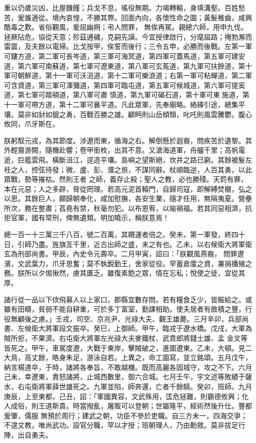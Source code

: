 \begin{pinyinscope}
 重以仍歲災凶，比屋饑饉；兵戈不息，徭役無期。力竭轉輸，身填溝壑。百姓愁苦，爰誰適從。境內哀惶，不勝其弊。回面內向，各懷性命之圖；黃髮稚齒，咸興酷毒之歎。省俗觀風，爰屈幽朔；弔人問罪，
 無俟再駕。親總六師，用申九伐。拯厥阽危，協從天意；殄茲逋穢，克嗣先謨。今宜授律啟行，分麾屆路；掩勃澥而雷震，及夫餘以電掃。比戈按甲，俟誓而後行；三令五申，必勝而後戰。左第一軍可鏤方道，第二軍可長岑道，第三軍可海冥道，第四軍可蓋馬道，第五軍可建安道，第六軍可南蘇道，第七軍可遼東道，第八軍可玄菟道，第九軍可扶餘道，第十軍可朝鮮道，第十一軍可沃沮道，第十二軍可樂浪道；右第一軍可粘蟬道，第二軍可含資道，第三軍可渾彌道，第四軍可臨屯道，第五軍可候城道，第六軍可提奚道，第七軍可踏頓道，第八軍可肅
 慎道，第九軍可碣石道，第十軍可東施道，第十一軍可帶方道，第十二軍可襄平道。凡此眾軍，先奉廟略。絡繹引途，總集平壤。莫非如豺如貔之勇，百戰百勝之雄。顧眄則山岳傾頹，叱吒則風雲騰鬱。腹心攸同，爪牙斯在。



 朕躬馭元戎，為其節度。涉遼而東，循海之右。解倒懸於遐裔，問疾苦於遺黎。其外輕齎游闕，隨機赴響；卷甲銜枚，出其不意。又滄海道軍，舟艫千里；高帆電逝，巨艦雲飛。橫斷沮江，逕造平壤。島嶼之望斯絕，坎井之路已窮。其餘被髮左衽之人，控弦待發；微、盧、彭、濮之旅，不謀同辭。杖順臨逆，人百其勇，以此眾戰，勢等摧枯。然則王者
 之師，義存止殺；聖人之教，必也勝殘。天罰有罪，本在元惡；人之多辟，脅從罔理。若高元泥首轅門，自歸司寇，即解縛焚櫬，弘之以恩。其餘巨人，願歸朝奉化，咸加慰撫，各安生業，隨才任用，無隔夷夏。營壘所次，務在整肅；萏堯有禁，秋毫勿犯。以布恩宥，以喻禍福。若其同惡相濟，抗拒官軍，國有常刑，俾無遺類。明加曉示，稱朕意焉！



 總一百一十三萬三千八百，號二百萬，其饋運者倍之。癸未，第一軍發，終四十日，引師乃盡。旌旗亙千里，近古出師之盛，未之有也。乙未，以右候衛大將軍衛玄為刑部尚書。甲辰，內史令元壽卒。二月甲寅，詔曰：「朕觀風燕裔，
 問罪遼濱，文武葉力，爪牙思奮；莫不執銳勤王，舍家從役。罕蓄倉廩之資，兼捐播殖之務。朕所以夕惕愀然，慮其匱乏。雖復素飽之眾，情在忘私；悅使之徒，宜從其厚。



 諸行從一品以下佽飛募人以上家口，郡縣宜數存問。若有糧食乏少，皆賑給之。或雖有田疇，貧弱不能自耕重，可於多丁富室，勤課相助。使夫居者有斂積之豐，行役無顧後之慮。」壬戎，司空、京兆尹、光祿大夫、觀王雄薨。三月辛卯，兵部尚書、左候衛大將軍段文振卒。癸巳，上御師。甲午，臨戎于遼水橋。戊戌，大軍為賊所拒，不果濟。右屯衛大將軍左光祿大夫麥鐵杖、武賁郎將錢士雄、孟
 金叉等皆死之。甲午，車駕度遼，大戰于東岸，擊賊破之，進圍遼東。乙未，大頓。見二大鳥，高丈餘，皓身朱足，游泳自若。上異之，命工圖寫，並立銘頌。五月戊午，納言楊達卒，于時，諸將各奉旨，不敢越機。既而高麗各固城守，攻之不下。六月己未，幸遼東，責怒諸將，止城西數里，御六合城。七月壬午，宇文述等敗績于薩水，右屯衛將軍薛世雄死之。九軍並陷，師奔還，亡者千餘騎。癸卯，班師。九月庚辰，上至東都，己丑，詔：「軍國異容，文武殊用，匡危拯難，則霸德攸興；化人成俗，則王道斯貴。時當撥亂，屠販可以登朝；世屬隆平，經術然後升仕。豐都爰肇，儒服
 無預於周行；建武之朝，功臣不參於吏職。自三方未一，四海交爭；不遑文教，唯尚武功。設官分職，罕以才授；班朝理人，乃由勳敘。莫非拔足行陣，出自勇夫。




\end{pinyinscope}
